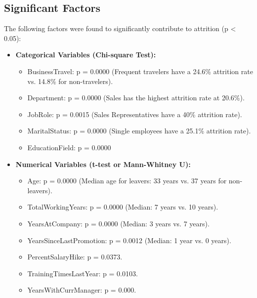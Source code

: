 \documentclass[12pt, a4paper]{article}
\begin{document}
\subsection{Significant Factors}
The following factors were found to significantly contribute to attrition (p < 0.05):
\begin{itemize}
    \item \textbf{Categorical Variables (Chi-square Test):}
    \begin{itemize}
        \item BusinessTravel: p = 0.0000 (Frequent travelers have a 24.6\% attrition rate vs. 14.8\% for non-travelers).
        \item Department: p = 0.0000 (Sales has the highest attrition rate at 20.6\%).
        \item JobRole: p = 0.0015 (Sales Representatives have a 40\% attrition rate).
        \item MaritalStatus: p = 0.0000 (Single employees have a 25.1\% attrition rate).
        \item EducationField: p = 0.0000
    \end{itemize}
    \item \textbf{Numerical Variables (t-test or Mann-Whitney U):}
    \begin{itemize}
        \item Age: p = 0.0000 (Median age for leavers: 33 years vs. 37 years for non-leavers).
        \item TotalWorkingYears: p = 0.0000 (Median: 7 years vs. 10 years).
        \item YearsAtCompany: p = 0.0000 (Median: 3 years vs. 7 years).
        \item YearsSinceLastPromotion: p = 0.0012 (Median: 1 year vs. 0 years).
        \item PercentSalaryHike: p = 0.0373.
        \item TrainingTimesLastYear: p = 0.0103.
        \item YearsWithCurrManager: p = 0.000.
    \end{itemize}
\end{itemize}
\end{document}

